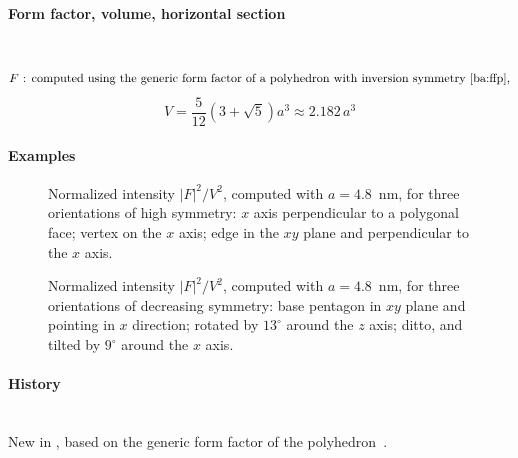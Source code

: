 \paragraph{Form factor, volume, horizontal section}\strut\\
\begin{equation*}
  F \text{~: computed using the generic form factor of a polyhedron
             with inversion symmetry~\cite{ba:ffp},}
\end{equation*}
\begin{equation*}
  V= \frac{5}{12} (3+\sqrt5)a^3 \approx 2.182\,a^3
\end{equation*}

\paragraph{Examples}\strut

\begin{figure}[H]
\begin{center}
\end{center}
\caption{Normalized intensity $|F|^2/V^2$,
computed with $a=4.8$~nm,
for three orientations of high symmetry:
$x$ axis perpendicular to a polygonal face;
vertex on the $x$ axis;
edge in the $xy$ plane and perpendicular to the $x$ axis.}
\end{figure}

\begin{figure}[H]
\begin{center}
\end{center}
\caption{Normalized intensity $|F|^2/V^2$,
computed with $a=4.8$~nm,
for three orientations of decreasing symmetry:
base pentagon in $xy$ plane and pointing in $x$ direction;
rotated by $13^\circ$ around the $z$ axis;
ditto, and tilted by $9^\circ$ around the $x$ axis.}
\end{figure}

\paragraph{History}\strut\\
New in ,
based on the generic form factor of the polyhedron~\cite{ba:ffp}.


 \label{SPrism3}

